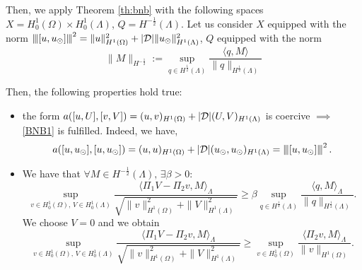 Then, we apply Theorem \ref{th:bnb} with the following spaces $X=H^1_0(\Omega) \times H^1_0(\Lambda)$, $Q=H^{-\frac 12}(\Lambda)$.
Let us consider $X$ equipped with the norm ${\left\vert\kern-0.25ex\left\vert\kern-0.25ex\left\vert [u,u_{\odot} ] \right\vert\kern-0.25ex\right\vert\kern-0.25ex\right\vert}^2=\|u\|^2_{H^1(\Omega)} + |\mathcal{D}|\|u_{\odot}\|^2_{H^1(\Lambda)}$, 
$Q$ equipped with the norm
\begin{equation*}
\|M \|_{H^{-\frac 12}} := \sup_{q\in H^{\frac 12}(\Lambda)}\frac{\langle q, M\rangle}{\|q\|_{H^{\frac 12}(\Lambda)}}
\end{equation*}

Then, the following properties hold true:
\begin{itemize}
\item the form $a([u,U], [v,V])= (u,v)_{H^1(\Omega)} + |{\cal D}|(U,V)_{H^1(\Lambda)}$ is coercive 
$\implies$ \eqref{BNB1} is fulfilled. Indeed, we have,
\begin{equation*}
a([u,\ud], [u,\ud])= (u,u)_{H^1(\Omega)} + |{\cal D}|(\ud,\ud)_{H^1(\Lambda)} = \vertiii{[u,\ud]}^2\,.
\end{equation*}

\item We have that $\forall M \in H^{-\frac 12}(\Lambda),\, \exists \beta >0$:
\begin{equation*}
\sup _{v\in H^1_0(\Omega),\, V \in H^1_0(\Lambda)} \frac{ \langle  \Pi_1 V - \Pi_2 v, M \rangle_\Lambda}{\sqrt{\|v\|^2_{H^1(\Omega)}+\|V \|^2_{H^1(\Lambda)}}}
\geq \beta \sup_{q\in H^{\frac 12}(\Lambda)}\frac{\langle q, M\rangle_\Lambda}{\|q\|_{H^{\frac 12}(\Lambda)}}.
\end{equation*}
We choose $V=0$ and we obtain
\begin{equation*}
\sup _{v\in H^1_0(\Omega),\, V \in H^1_0(\Lambda)} \frac{ \langle  \Pi_1 V - \Pi_2 v, M \rangle_\Lambda}{\sqrt{\|v\|^2_{H^1(\Omega)}+\|V \|^2_{H^1(\Lambda)}}}
\geq \sup _{v\in H^1_0(\Omega)} \frac{ \langle \Pi_2 v, M \rangle_\Lambda}{\|v\|_{H^1(\Omega)}}. 
\end{equation*}


\end{itemize}
